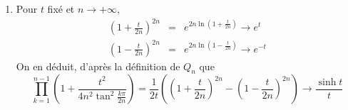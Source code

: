 \begin{enumerate}
\begin{enumerate}
\item Pour $t$ fix\'{e} et $n\rightarrow +\infty $, 
\begin{eqnarray*}
\left( 1+\frac{t}{2n}\right) ^{2n} &=&e^{2n\ln \left( 1+\frac{t}{2n}\right)} \rightarrow e^{t} \\
\left( 1-\frac{t}{2n}\right) ^{2n} &=&e^{2n\ln \left( 1-\frac{t}{2n}\right)} \rightarrow e^{-t}
\end{eqnarray*}
On en d\'{e}duit, d'apr\`{e}s la d\'{e}finition de $Q_{n}$ que 
\[
\prod_{k=1}^{n-1}\left( 1+\frac{t^{2}}{4n^{2}\tan ^{2}\frac{k\pi }{2n}}\right) =\frac{1}{2t}\left(\left( 1+\frac{t}{2n}\right) ^{2n} -\left( 1-\frac{t}{2n}\right) ^{2n}\right)\rightarrow \frac{\sinh t}{t}
\]
\end{enumerate}
\end{enumerate}

